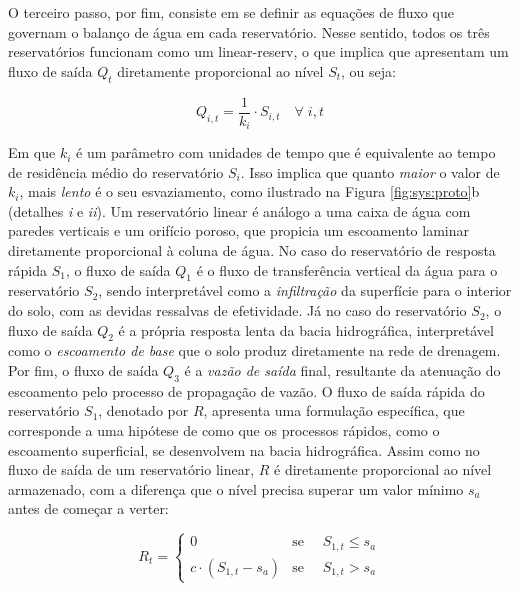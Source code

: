 \documentclass[./main.tex]{subfiles}
\begin{document}
\par O terceiro passo, por fim, consiste em se definir as equações de fluxo que governam o balanço de água em cada reservatório. Nesse sentido, todos os três reservatórios funcionam como um \gls{linear-reserv}, o que implica que apresentam um fluxo de saída $Q_t$ diretamente proporcional ao nível $S_t$, ou seja:
\begin{linenomath*}
\begin{equation} 
	\label{eq:linear_reservoir}
	Q_{i, t} = \frac{1}{k_{i}} \cdot S_{i,t} \quad \forall \;  i, t 
\end{equation}
\end{linenomath*}
Em que $k_i$ é um parâmetro com unidades de tempo que é equivalente ao tempo de residência médio do reservatório $S_i$. Isso implica que quanto \textit{maior} o valor de $k_i$, mais \textit{lento} é o seu esvaziamento, como ilustrado na Figura \ref{fig:sys:proto}b (detalhes \textit{i} e \textit{ii}). Um reservatório linear é análogo a uma caixa de água com paredes verticais e um orifício poroso, que propicia um escoamento laminar diretamente proporcional à coluna de água. No caso do reservatório de resposta rápida $S_1$, o fluxo de saída $Q_1$ é o fluxo de transferência vertical da água para o reservatório $S_2$, sendo interpretável como a \textit{infiltração} da superfície para o interior do solo, com as devidas ressalvas de efetividade. Já no caso do reservatório $S_2$, o fluxo de saída $Q_2$ é a própria resposta lenta da bacia hidrográfica, interpretável como o \textit{escoamento de base} que o solo produz diretamente na rede de drenagem. Por fim, o fluxo de saída $Q_3$ é a \textit{vazão de saída} final, resultante da atenuação do escoamento pelo processo de propagação de vazão. O fluxo de saída rápida do reservatório $S_1$, denotado por $R$, apresenta uma formulação específica, que corresponde a uma hipótese de como que os processos rápidos, como o escoamento superficial, se desenvolvem na bacia hidrográfica. Assim como no fluxo de saída de um reservatório linear, $R$ é diretamente proporcional ao nível armazenado, com a diferença que o nível precisa superar um valor mínimo $s_a$ antes de começar a verter:
\begin{linenomath*}
\begin{equation} 
	\label{eq:fast_response}
 R_{t} = 
\begin{cases} 
    0 & \text{se } \quad S_{1,t} \leq s_a\\
    c \cdot (S_{1,t} - s_a) & \text{se } \quad S_{1,t} > s_a
\end{cases}
\end{equation}
\end{linenomath*}
\end{document}
